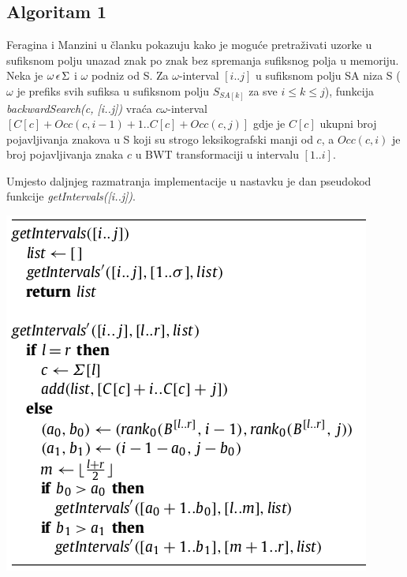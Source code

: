 \documentclass[times, utf8, seminar, numeric]{fer}
\begin{document}
\subsection{Algoritam 1}
Feragina  i Manzini u članku\cite{feragina} pokazuju kako je moguće pretraživati uzorke u sufiksnom polju unazad znak po znak bez spremanja sufiksnog polja u memoriju. Neka je $\omega\hspace{0.5mm} \epsilon\hspace{0.5mm} \Sigma $ i $ \omega$ podniz od S. Za $\omega$-interval $[i..j]$ u sufiksnom polju SA niza S ($\omega$ je prefiks svih sufiksa u sufiksnom polju $S_{SA[k]}$ za sve $ i \leq k \leq j $), funkcija \textit{backwardSearch(c, [i..j])} vraća $ c\omega$-interval $[C[c] + Occ(c, i -1) + 1.. C[c] + Occ(c,j) ]$ gdje je $C[c]$ ukupni broj pojavljivanja znakova u S koji su strogo leksikografski manji od $c$, a $Occ(c,i)$ je broj pojavljivanja znaka $c$ u BWT transformaciji u intervalu $[1..i]$.

Umjesto daljnjeg razmatranja implementacije u nastavku je dan pseudokod funkcije \textit{getIntervals([i..j])}. 


\begin{center}
	\includegraphics[scale=0.7]{slike/algorithm_1.png}
	\label{alg1}
\end{center}
\end{document}
